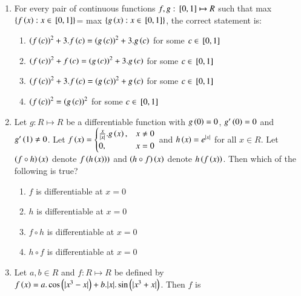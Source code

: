 \documentclass[journal,12pt,twocolumn]{IEEEtran}
\theoremstyle{remark}
\begin{document}
\begin{enumerate}
    \item 
    {For every pair of continuous functions $f, g: {}\left[0, 1\right]\mapsto R$ such that max $\{f\left(x\right): x\in {}\left[0, 1\right]\}$= max $\{g\left(x\right): x\in {}\left[0, 1\right]\}$, the correct statement is:}
   
    \hfill 
    {}
    
    \begin{enumerate}[label=(\alph*)]
        
        \item ${\left(f\left(c\right)\right)}^2+3.f\left(c\right)={\left(g\left(c\right)\right)}^2+3.g\left(c\right)$ for some $c\in {}\left[0,1\right]$
        \item ${\left(f\left(c\right)\right)}^2+f\left(c\right)={\left(g\left(c\right)\right)}^2+3.g\left(c\right)$ for some $c\in {}\left[0,1\right]$
        \item ${\left(f\left(c\right)\right)}^2+3.f\left(c\right)={\left(g\left(c\right)\right)}^2+g\left(c\right)$ for some $c\in {}\left[0,1\right]$
        \item ${\left(f\left(c\right)\right)}^2={\left(g\left(c\right)\right)}^2$ for some $c\in {}\left[0,1\right]$ 
    \end{enumerate}


    \item 
    {Let $g: R\mapsto R$ be a differentiable function with $g\left(0\right)=0$, $g'\left(0\right)=0$ and $g'\left(1\right)\neq 0$. Let $f\left(x\right)=
        \begin{cases}
            \frac{x}{|x|}.g\left(x\right), & x\neq 0 \\
            0, & x=0
        \end{cases}$ 
        and $h\left(x\right)=e^{|x|}$ for all $x\in R$. Let $\left(f\circ h\right)\left(x\right)$ denote $f\left(h\left(x\right)\right))$ and $\left(h\circ f\right)\left(x\right)$ denote $h\left(f\left(x\right)\right)$. Then which of the following is true?}
        
    \hfill 
    {}
    
    \begin{enumerate}[label=(\alph*)]
        
        \item $f$ is differentiable at $x=0$ 
        \item $h$ is differentiable at $x=0$ 
        \item $f\circ h$ is differentiable at $x=0$ 
        \item $h\circ f$ is differentiable at $x=0$  
    \end{enumerate}


    \item 
    {Let $a, b\in R$ and $f: R\mapsto R$ be defined by $f\left(x\right)=a.\cos \left(|x^3-x|\right) +b.|x|.\sin \left(|x^3+x|\right)$. Then $f$ is}   
        

\end{enumerate}
\end{document}

